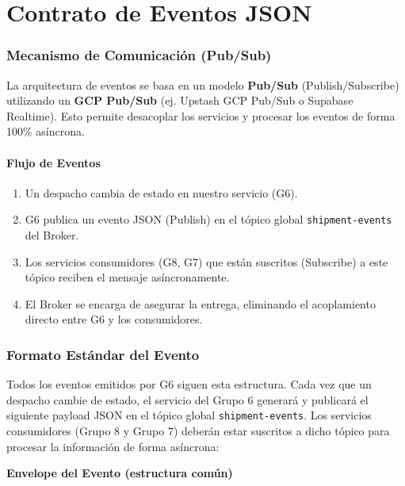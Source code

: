 \documentclass[11pt, a4paper]{article}
\newcommand{\contractheader}[1]{%
  \noindent\colorbox{primary!10}{%
    \parbox{\dimexpr\textwidth-2\fboxsep}{%
      \textbf{\faFileCode\quad #1}%
    }%
  }
  \vspace{0.3cm}
}
\begin{document}
\newpage
\part{Contrato de Eventos JSON}

\section{Mecanismo de Comunicación (Pub/Sub)}

La arquitectura de eventos se basa en un modelo \textbf{Pub/Sub} (Publish/Subscribe) utilizando un \textbf{GCP Pub/Sub} (ej. Upstash GCP Pub/Sub o Supabase Realtime). 
Esto permite desacoplar los servicios y procesar los eventos de forma 100\% asíncrona.

\subsection{Flujo de Eventos}

\begin{enumerate}[noitemsep]
  \item Un despacho cambia de estado en nuestro servicio (G6).
  \item G6 publica un evento JSON (Publish) en el tópico global \texttt{shipment-events} del Broker.
  \item Los servicios consumidores (G8, G7) que están suscritos (Subscribe) a este tópico reciben el mensaje asíncronamente.
  \item El Broker se encarga de asegurar la entrega, eliminando el acoplamiento directo entre G6 y los consumidores.
\end{enumerate}


\section{Formato Estándar del Evento}
\label{sec:formato-evento}

Todos los eventos emitidos por G6 siguen esta estructura. Cada vez que un despacho cambie de estado, el servicio del Grupo 6 generará y publicará el siguiente payload JSON en el tópico global \texttt{shipment-events}. Los servicios consumidores (Grupo 8 y Grupo 7) deberán estar suscritos a dicho tópico para procesar la información de forma asíncrona:

\contractheader{Envelope del Evento (estructura común)}
\end{document}
